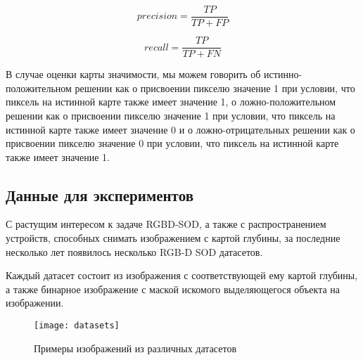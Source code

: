 \begin{equation}
    precision = \frac{TP}{TP+FP}
\end{equation}

\begin{equation}
    recall = \frac{TP}{TP+FN}
\end{equation}

В случае оценки карты значимости, мы можем 
говорить об истинно-положительном решении 
как о присвоении пикселю значение 1 при условии, что 
пиксель на истинной карте также имеет значение 1, 
о ложно-положительном решении как о присвоении пикселю значение 1 при условии, что 
пиксель на истинной карте также имеет значение 0 
и о ложно-отрицательных решении как о присвоении пикселю значение 0 при условии, что 
пиксель на истинной карте также имеет значение 1. 

\subsection{Данные для экспериментов}

С растущим интересом к задаче RGBD-SOD, а также с распространением устройств, способных 
снимать изображением с картой глубины, за последние несколько лет появилось несколько RGB-D SOD датасетов.

Каждый датасет состоит из изображения с соответствующей ему картой глубины, а также
бинарное изображение с маской искомого выделяющегося объекта на изображении.

\begin{figure}[h]
    \centering
    \texttt{[image: datasets]}
    \caption{Примеры изображений из различных датасетов}
    \label{fig:dataset}
\end{figure}

